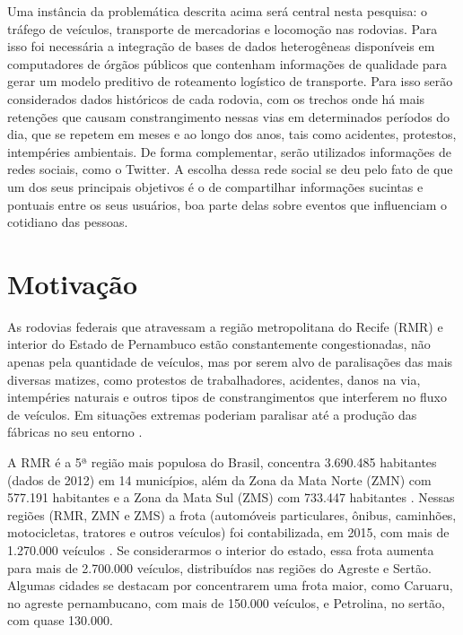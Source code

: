 Uma instância da problemática descrita acima será central nesta pesquisa: o tráfego de veículos, transporte de mercadorias e locomoção nas rodovias.  Para isso foi necessária a integração de bases de dados heterogêneas disponíveis em computadores de órgãos públicos 
que contenham informações de qualidade para gerar um modelo preditivo de roteamento logístico de transporte. Para isso serão considerados dados históricos de cada rodovia, com os trechos onde há mais 
retenções que causam constrangimento nessas vias em determinados períodos do dia, que se repetem em meses e ao longo dos anos, tais como acidentes, protestos, intempéries ambientais.
De forma complementar, serão utilizados informações de redes sociais, como o Twitter. A escolha dessa rede social se deu pelo fato de que um dos seus principais objetivos é o de compartilhar informações sucintas e pontuais entre os seus usuários, boa parte delas sobre eventos que influenciam o cotidiano das pessoas.



\section{ Motivação}\label{intro:motivacao}

As rodovias federais que atravessam a região metropolitana do Recife (RMR) e interior do Estado de Pernambuco estão constantemente congestionadas, não apenas pela 
quantidade de veículos, mas por serem alvo de paralisações das mais diversas matizes, como protestos de trabalhadores, acidentes, danos na via, intempéries naturais e outros tipos de constrangimentos que interferem no fluxo de veículos. 
Em situações extremas poderiam paralisar até a produção das fábricas no seu entorno \cite{BNDES2013}. 

A RMR é a 5ª região mais populosa do Brasil, concentra 3.690.485 habitantes (dados de 2012) em 14 municípios, além da 
Zona da Mata Norte (ZMN) com 577.191 habitantes e a Zona da Mata Sul (ZMS) com 733.447 habitantes \cite{Bitoun2012}. 
Nessas regiões (RMR, ZMN e ZMS) a frota (automóveis particulares, ônibus, caminhões, motocicletas, tratores e outros veículos) 
foi contabilizada, em 2015, com mais de 1.270.000 veículos \cite{FrotaVeiculosIBGE}. Se considerarmos o interior do estado, essa frota aumenta para mais de 2.700.000 veículos, distribuídos nas regiões do Agreste e Sertão. Algumas cidades se destacam por concentrarem uma frota maior, como Caruaru, no agreste pernambucano, com mais de 150.000 veículos, e Petrolina, no sertão, com quase 130.000. 
																			
